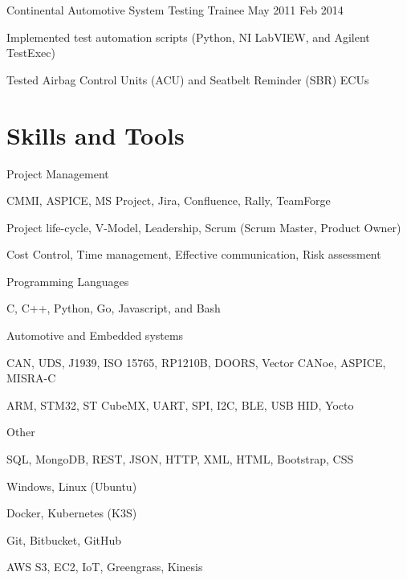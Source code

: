 \documentclass{resume} %
\begin{document}
\job
    {Continental Automotive}
    {System Testing Trainee}
    {May 2011}
    {Feb 2014}
    {}
    {
    \begin{itemize-bullets}
    \item{Implemented test automation scripts (Python, NI LabVIEW, and Agilent TestExec)}
    \item{Tested Airbag Control Units (ACU) and Seatbelt Reminder (SBR) ECUs}
    \end{itemize-bullets}
    }



\section{Skills and Tools}


\skillgroup
    {Project Management}
    {
    \begin{itemize-bullets}
        \item{CMMI, ASPICE, MS Project, Jira, Confluence, Rally, TeamForge}
        \item{Project life-cycle, V-Model, Leadership, Scrum (Scrum Master, Product Owner)}
        \item{Cost Control, Time management, Effective communication, Risk assessment}
        \end{itemize-bullets}
    }


\skillgroup
    {Programming Languages}
    {
    \begin{itemize-bullets}
        \item{C, C++, Python, Go, Javascript, and Bash}
        \end{itemize-bullets}
    }


\skillgroup
    {Automotive and Embedded systems}
    {
    \begin{itemize-bullets}
        \item{CAN, UDS, J1939, ISO 15765, RP1210B, DOORS, Vector CANoe, ASPICE, MISRA-C}
        \item{ARM, STM32, ST CubeMX, UART, SPI, I2C, BLE, USB HID, Yocto}
        \end{itemize-bullets}
    }


\skillgroup
    {Other}
    {
    \begin{itemize-bullets}
        \item{SQL, MongoDB, REST, JSON, HTTP, XML, HTML, Bootstrap, CSS}
        \item{Windows, Linux (Ubuntu)}
        \item{Docker, Kubernetes (K3S)}
        \item{Git, Bitbucket, GitHub}
        \item{AWS S3, EC2, IoT, Greengrass, Kinesis}
        \end{itemize-bullets}
    }
\end{document}
